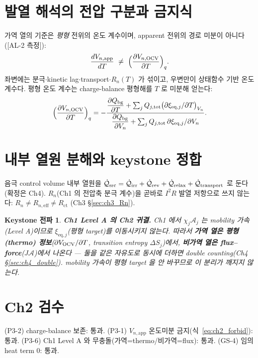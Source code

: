 \documentclass[11pt,a4paper]{article}
\newtheorem*{keybox}{Keystone 전파}
\newcommand{\eff}{\mathrm{eff}}\newcommand{\eq}{\mathrm{eq}}\newcommand{\app}{\mathrm{app}}
\newcommand{\rev}{\mathrm{rev}}\newcommand{\ct}{\mathrm{ct}}\newcommand{\AL}[1]{\textsf{[AL-#1]}}
\begin{document}
\section{발열 해석의 전압 구분과 금지식}\label{sec:ch2_volt}
가역 열의 기준은 \emph{평형} 전위의 온도 계수이며, apparent 전위의 경로 미분이 아니다(\AL{2 측정}):
\begin{equation}
\frac{dV_{n,\app}}{dT}\ \ne\ \Big(\frac{\partial V_{n,\OCV}}{\partial T}\Big)_q .
\label{eq:ch2_forbid}
\end{equation}
좌변에는 분극$\cdot$kinetic lag$\cdot$transport$\cdot$$R_n(T)$ 가 섞이고, 우변만이 상태함수 기반
온도 계수다. 평형 온도 계수는 charge-balance 평형해를 $T$ 로 미분해 얻는다:
\begin{equation}
\Big(\frac{\partial V_{n,\OCV}}{\partial T}\Big)_q=
-\frac{\dfrac{\partial Q_\bg}{\partial T}+\sum_j Q_{j,\tot}\big(\partial \xi_{\eq,j}/\partial T\big)_{V_n}}
{\dfrac{\partial Q_\bg}{\partial V_n}+\sum_j Q_{j,\tot}\,\partial \xi_{\eq,j}/\partial V_n} .
\label{eq:ch2_dvdt}
\end{equation}

\section{내부 열원 분해와 keystone 정합}\label{sec:ch2_heat}
음극 control volume 내부 열원을
$\dot{\mathcal Q}_{\mathrm{src}}=\dot{\mathcal Q}_{\irr}+\dot{\mathcal Q}_{\rev}+\dot{\mathcal Q}_{\mathrm{relax}}+\dot{\mathcal Q}_{\mathrm{transport}}$
로 둔다(확정은 Ch4). $R_n$(Ch1 의 전압축 분극 계수)을 곧바로 $I^2R$ 발열 저항으로 쓰지 않는다:
$R_n\ne R_{n,\eff}\ne R_{\ct}$ (Ch3 \S\ref{sec:ch3_Rn}).

\begin{keybox}
\textbf{Ch1 Level A 의 Ch2 귀결.} Ch1 에서 $\chi_j\mathcal A_j$ 는 mobility 가속(Level A)이므로
$\xi_{\eq,j}$(평형 target)를 이동시키지 \emph{않는다}. 따라서 \textbf{가역 열은 평형(thermo)
정보}($\partial V_{\mathrm{OCV}}/\partial T$, transition entropy $\Delta S_j$)에서, \textbf{비가역 열은
flux--force}($J\mathcal A$)에서 나온다 — 둘을 같은 자유도로 동시에 더하면 double counting(Ch4
\S\ref{sec:ch4_double}). mobility 가속이 평형 target 을 안 바꾸므로 이 분리가 깨지지 않는다.
\end{keybox}

\section{Ch2 검수}\label{sec:ch2_check}
{\small (P3-2) charge-balance 보존: 통과. (P3-1) $V_{n,\app}$ 온도미분 금지(식~\eqref{eq:ch2_forbid}):
통과. (P3-6) Ch1 Level A 와 무충돌(가역=thermo/비가역=flux): 통과. (GS-4) 임의 heat term 0: 통과.}
\end{document}
